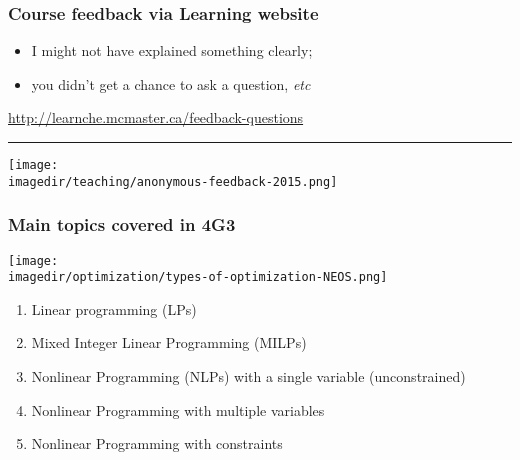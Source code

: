 \begin{frame}\frametitle{Course feedback via Learning website}
	\begin{itemize}
		\item	I might not have explained something clearly;
		\item	you didn't get a chance to ask a question, \emph{etc}
	\end{itemize}
	\href{http://learnche.mcmaster.ca/feedback-questions}{http://learnche.mcmaster.ca/feedback-questions}
	\vspace{12pt}
	\hrule
	\begin{center}
		\texttt{[image: \\imagedir/teaching/anonymous-feedback-2015.png]}
	\end{center}
\end{frame}

\begin{frame}\frametitle{Main topics covered in 4G3}
	\centerline{\texttt{[image: \\imagedir/optimization/types-of-optimization-NEOS.png]}}
	\begin{enumerate}
		\item	Linear programming (LPs)
		\item	Mixed Integer Linear Programming (MILPs)
		\item	Nonlinear Programming (NLPs) with a single variable (unconstrained)
		\item	Nonlinear Programming with multiple variables 
		\item	Nonlinear Programming with constraints
	\end{enumerate}
\end{frame}

